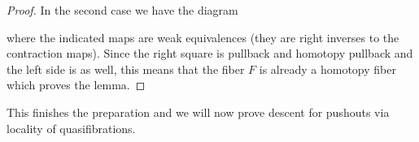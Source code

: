 \begin{lemma}
\begin{proof}
        In the second case we have the diagram
        \begin{center}
        \end{center}
        where the indicated maps are weak equivalences (they are right inverses to the contraction maps).
        Since the right square is pullback and homotopy pullback and the left side is as well, this means that the fiber $F$ is already a homotopy fiber which proves the lemma.
    \end{proof}
\end{lemma}
This finishes the preparation and we will now prove descent for pushouts via locality of quasifibrations.
